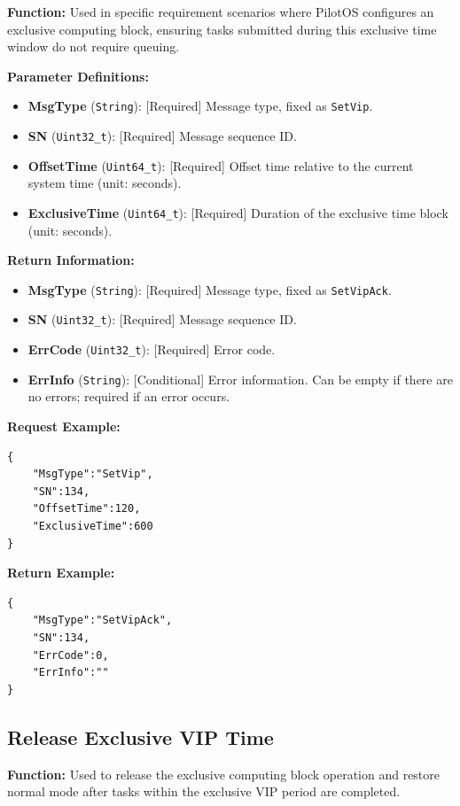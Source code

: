 \documentclass[12pt, a4paper]{article}
\begin{document}
\textbf{Function:} Used in specific requirement scenarios where PilotOS configures an exclusive computing block, ensuring tasks submitted during this exclusive time window do not require queuing.

\textbf{Parameter Definitions:}
\begin{itemize}
    \item \textbf{MsgType} (\texttt{String}): [Required] Message type, fixed as \texttt{SetVip}.
    \item \textbf{SN} (\texttt{Uint32\_t}): [Required] Message sequence ID.
    \item \textbf{OffsetTime} (\texttt{Uint64\_t}): [Required] Offset time relative to the current system time (unit: seconds).
    \item \textbf{ExclusiveTime} (\texttt{Uint64\_t}): [Required] Duration of the exclusive time block (unit: seconds).
\end{itemize}

\textbf{Return Information:}
\begin{itemize}
    \item \textbf{MsgType} (\texttt{String}): [Required] Message type, fixed as \texttt{SetVipAck}.
    \item \textbf{SN} (\texttt{Uint32\_t}): [Required] Message sequence ID.
    \item \textbf{ErrCode} (\texttt{Uint32\_t}): [Required] Error code.
    \item \textbf{ErrInfo} (\texttt{String}): [Conditional] Error information. Can be empty if there are no errors; required if an error occurs.
\end{itemize}

\noindent \textbf{Request Example:}
\begin{lstlisting}
{
    "MsgType":"SetVip",
    "SN":134,
    "OffsetTime":120,
    "ExclusiveTime":600
}
\end{lstlisting}

\noindent \textbf{Return Example:}
\begin{lstlisting}
{
    "MsgType":"SetVipAck",
    "SN":134,
    "ErrCode":0,
    "ErrInfo":""
}
\end{lstlisting}

\subsection{Release Exclusive VIP Time}

\textbf{Function:} Used to release the exclusive computing block operation and restore normal mode after tasks within the exclusive VIP period are completed.
\end{document}
